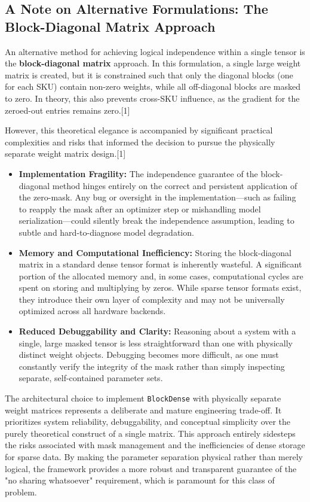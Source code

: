 \documentclass{article}
\begin{document}
\subsection{A Note on Alternative Formulations: The Block-Diagonal Matrix Approach}

An alternative method for achieving logical independence within a single tensor is the \textbf{block-diagonal matrix} approach. In this formulation, a single large weight matrix is created, but it is constrained such that only the diagonal blocks (one for each SKU) contain non-zero weights, while all off-diagonal blocks are masked to zero. In theory, this also prevents cross-SKU influence, as the gradient for the zeroed-out entries remains zero.[1]

However, this theoretical elegance is accompanied by significant practical complexities and risks that informed the decision to pursue the physically separate weight matrix design.[1]
\begin{itemize}
    \item \textbf{Implementation Fragility:} The independence guarantee of the block-diagonal method hinges entirely on the correct and persistent application of the zero-mask. Any bug or oversight in the implementation—such as failing to reapply the mask after an optimizer step or mishandling model serialization—could silently break the independence assumption, leading to subtle and hard-to-diagnose model degradation.
    \item \textbf{Memory and Computational Inefficiency:} Storing the block-diagonal matrix in a standard dense tensor format is inherently wasteful. A significant portion of the allocated memory and, in some cases, computational cycles are spent on storing and multiplying by zeros. While sparse tensor formats exist, they introduce their own layer of complexity and may not be universally optimized across all hardware backends.
    \item \textbf{Reduced Debuggability and Clarity:} Reasoning about a system with a single, large masked tensor is less straightforward than one with physically distinct weight objects. Debugging becomes more difficult, as one must constantly verify the integrity of the mask rather than simply inspecting separate, self-contained parameter sets.
\end{itemize}
The architectural choice to implement \texttt{BlockDense} with physically separate weight matrices represents a deliberate and mature engineering trade-off. It prioritizes system reliability, debuggability, and conceptual simplicity over the purely theoretical construct of a single matrix. This approach entirely sidesteps the risks associated with mask management and the inefficiencies of dense storage for sparse data. By making the parameter separation physical rather than merely logical, the framework provides a more robust and transparent guarantee of the "no sharing whatsoever" requirement, which is paramount for this class of problem.
\end{document}
